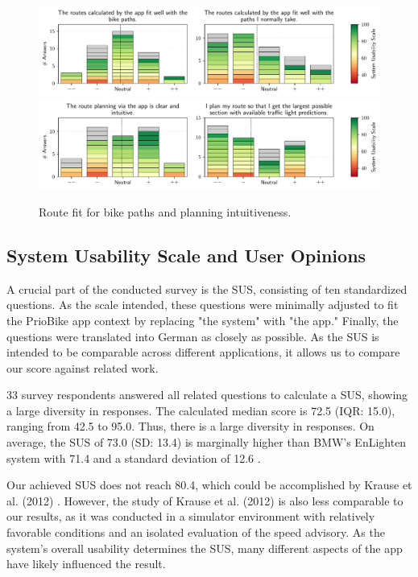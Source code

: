 \begin{figure}[!b]
\caption{Route fit for bike paths and planning intuitiveness.}\label{fig:route-fit-bike-paths}
\includegraphics[width=\linewidth]{images/app-usability-questions-route-fit-bike-paths.pdf}
\\
\includegraphics[width=\linewidth]{images/app-usability-questions-route-planning-intuitiveness.pdf}
\end{figure}

\subsection{System Usability Scale and User Opinions}

A crucial part of the conducted survey is the SUS, consisting of ten standardized questions. As the scale intended, these questions were minimally adjusted to fit the PrioBike app context by replacing "the system" with "the app." Finally, the questions were translated into German as closely as possible. As the SUS is intended to be comparable across different applications, it allows us to compare our score against related work. 

33 survey respondents answered all related questions to calculate a SUS, showing a large diversity in responses. The calculated median score is 72.5 (IQR: 15.0), ranging from 42.5 to 95.0. Thus, there is a large diversity in responses. On average, the SUS of 73.0 (SD: 13.4) is marginally higher than BMW's EnLighten system with 71.4 and a standard deviation of 12.6 \cite{wilson_driver_2017}. 

Our achieved SUS does not reach 80.4, which could be accomplished by Krause et al. (2012) \cite{krause_traffic_2012}. However, the study of Krause et al. (2012) \cite{krause_traffic_2012} is also less comparable to our results, as it was conducted in a simulator environment with relatively favorable conditions and an isolated evaluation of the speed advisory. As the system's overall usability determines the SUS, many different aspects of the app have likely influenced the result.

